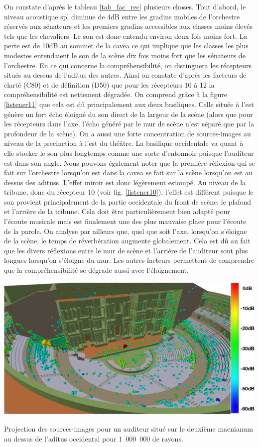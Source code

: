  
On constate d'après le tableau \ref{tab_fac_rec} plusieurs choses. Tout d'abord, le niveau acoustique \gls{spl} diminue de 4dB entre les gradins mobiles de l'orchestre réservés aux sénateurs et les premiers gradins accessibles aux classes moins élevés tels que les chevaliers. Le son est donc entendu environ deux fois moins fort. La perte est de 10dB au sommet de la \gls{cavea} ce qui implique que les classes les plus modestes entendaient le son de la scène dix fois moins fort que les sénateurs de l'orchestre. En ce qui concerne la compréhensibilité, on distinguera les récepteurs situés au dessus de l'\gls{aditus} des autres. Ainsi on constate d'après les facteurs de clarté (\gls{C80}) et de définition (\gls{D50}) que pour les récepteurs 10 à 12 la compréhensibilité est nettement dégradée. On comprend grâce à la figure \ref{listener11} que cela est dû principalement aux deux \glspl{basilique}. Celle située à l'est génère un fort écho éloigné du son direct de la largeur de la scène (alors que pour les récepteurs dans l'axe, l'écho généré par le mur de scène n'est séparé que par la profondeur de la scène). On a aussi une forte concentration de sources-images au niveau de la \gls{precinction} à l'est du théâtre. La basilique occidentale va quant à elle stocker le son plus longtemps comme une sorte d'entonnoir puisque l'auditeur est dans son angle. Nous pouvons également noter que la première réflexion qui se fait sur l'orchestre lorsqu'on est dans la \gls{cavea} se fait sur la scène lorsqu'on est au dessus des \glspl{aditus}. L'effet miroir est donc légèrement estompé. Au niveau de la tribune, donc du récepteur 10 (voir fig. \ref{listener10}), l'effet est différent puisque le son provient principalement de la partie occidentale du front de scène, le plafond et l'arrière de la tribune. Cela doit être particulièrement bien adapté pour l'écoute musicale mais est finalement une des plus mauvaise place pour l'écoute de la parole.
On analyse par ailleurs que, quel que soit l'axe, lorsqu'on s'éloigne de la scène, le temps de réverbération augmente globalement. Cela est dû au fait que les divers réflexions entre le mur de scène et l'arrière de l'auditeur sont plus longues lorsqu'on s'éloigne du mur. Les autres facteurs permettent de comprendre que la compréhensibilité se dégrade aussi avec l'éloignement. 
\begin{figureth}
	\includegraphics[width=\linewidth]{images/Listener11}
	\caption{Projection des sources-images pour un auditeur situé sur le deuxième \gls{maenianum} au dessus de l'\gls{aditus} occidental pour 1~000~000 de rayons.}
	\label{listener11}
\end{figureth}
